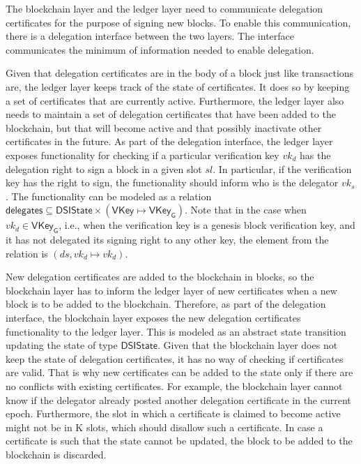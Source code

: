 \documentclass[11pt,a4paper]{article}
\newcommand{\fun}[1]{\mathsf{#1}}
\newcommand{\type}[1]{\mathsf{#1}}
\newcommand{\VKey}{\type{VKey}}
\newcommand{\VKeyGen}{\type{VKey_G}}
\newcommand{\DelegState}{\type{DSIState}}
\newcommand{\delegationname}{delegates} %
\newcommand{\partialf}{\mapsto}
\begin{document}
The blockchain layer and the ledger layer need to communicate delegation
certificates for the purpose of signing new blocks.
%
To enable this communication, there is a delegation interface between the two
layers.
%
The interface communicates the minimum of information needed to enable
delegation.


Given that delegation certificates are in the body of a block just like
transactions are, the ledger layer keeps track of the state of certificates.
%
It does so by keeping a set of certificates that are currently active.
%
Furthermore, the ledger layer also needs to maintain a set of delegation
certificates that have been added to the blockchain, but that will become
active and that possibly inactivate other certificates in the future.
%
As part of the delegation interface, the ledger layer exposes functionality
for checking if a particular verification key $vk_d$ has the delegation right
to sign a block in a given slot $sl$.
%
In particular, if the verification key has the right to sign, the
functionality should inform who is the delegator $vk_s$.
%
The functionality can be modeled as a relation
$\fun{\delegationname} \subseteq \DelegState \times (\VKey \partialf \VKeyGen)$.
%
Note that in the case when $vk_d \in \VKeyGen$, i.e., when the verification
key is a genesis block verification key, and it has not delegated its signing
right to any other key, the element from the relation is
$(ds, vk_d \partialf vk_d)$.


New delegation certificates are added to the blockchain in blocks, so the
blockchain layer has to inform the ledger layer of new certificates when a new
block is to be added to the blockchain.
%
Therefore, as part of the delegation interface, the blockchain layer exposes
the new delegation certificates functionality to the ledger layer.
%
This is modeled as an abstract state transition updating the state of type
$\DelegState$.
%
Given that the blockchain layer does not keep the state of delegation
certificates, it has no way of checking if certificates are valid.
%
That is why new certificates can be added to the state only if there are no
conflicts with existing certificates.
%
For example, the blockchain layer cannot know if the delegator already posted
another delegation certificate in the current epoch.
%
Furthermore, the slot in which a certificate is claimed to become active might
not be in K slots, which should disallow such a certificate.
%
In case a certificate is such that the state cannot be updated, the block to
be added to the blockchain is discarded.
\end{document}
